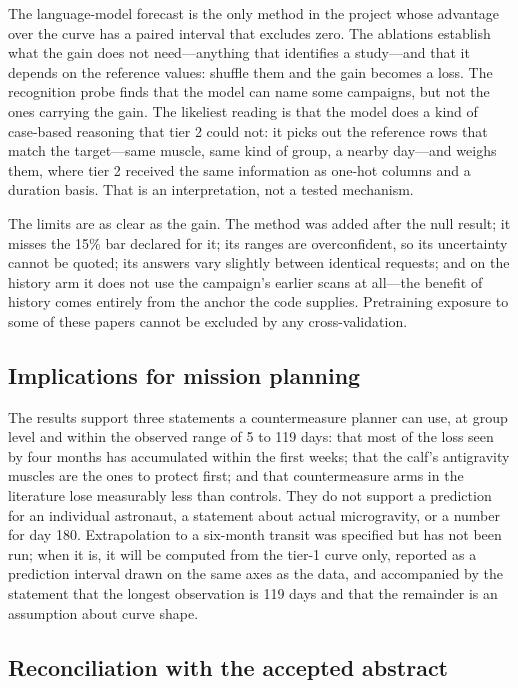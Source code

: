 The language-model forecast is the only method in the project whose advantage over the curve has a paired interval
that excludes zero. The ablations establish what the gain does not need---anything that identifies a study---and that
it depends on the reference values: shuffle them and the gain becomes a loss. The recognition probe finds that the
model can name some campaigns, but not the ones carrying the gain. The likeliest reading is that the model does a kind
of case-based reasoning that tier 2 could not: it picks out the reference rows that match the target---same muscle,
same kind of group, a nearby day---and weighs them, where tier 2 received the same information as one-hot columns and
a duration basis. That is an interpretation, not a tested mechanism.

The limits are as clear as the gain. The method was added after the null result; it misses the 15\% bar declared for
it; its ranges are overconfident, so its uncertainty cannot be quoted; its answers vary slightly between identical
requests; and on the history arm it does not use the campaign's earlier scans at all---the benefit of history comes
entirely from the anchor the code supplies. Pretraining exposure to some of these papers cannot be excluded by any
cross-validation.

\subsection{Implications for mission planning}

The results support three statements a countermeasure planner can use, at group level and within the observed range
of 5 to 119 days: that most of the loss seen by four months has accumulated within the first weeks; that the calf's
antigravity muscles are the ones to protect first; and that countermeasure arms in the literature lose measurably
less than controls. They do not support a prediction for an individual astronaut, a statement about actual
microgravity, or a number for day 180. Extrapolation to a six-month transit was specified but has not been run; when
it is, it will be computed from the tier-1 curve only, reported as a prediction interval drawn on the same axes as the
data, and accompanied by the statement that the longest observation is 119 days and that the remainder is an
assumption about curve shape.

\subsection{Reconciliation with the accepted abstract}
\label{sec:abstract-reconciliation}

